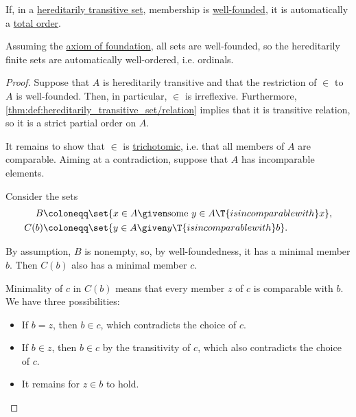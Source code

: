 \begin{lemma}\label{thm:well_founded_hereditarily_transitive_set}
  If, in a \hyperref[def:hereditarily_transitive_set]{hereditarily transitive set}, membership is \hyperref[def:well_founded_relation]{well-founded}, it is automatically a \hyperref[def:totally_ordered_set]{total order}.
\end{lemma}
\begin{comments}
  \item Assuming the \hyperref[def:zfc/foundation]{axiom of foundation}, all sets are well-founded, so the hereditarily finite sets are automatically well-ordered, i.e. ordinals.
\end{comments}
\begin{proof}
  Suppose that \( A \) is hereditarily transitive and that the restriction of \( {\in} \) to \( A \) is well-founded. Then, in particular, \( {\in} \) is irreflexive. Furthermore, \cref{thm:def:hereditarily_transitive_set/relation} implies that it is transitive relation, so it is a strict partial order on \( A \).

  It remains to show that \( {\in} \) is \hyperref[def:totally_ordered_set/trichotomic]{trichotomic}, i.e. that all members of \( A \) are comparable. Aiming at a contradiction, suppose that \( A \) has incomparable elements.

  Consider the sets
  \begin{align*}
    B    &\coloneqq \set{ x \in A \given \text{some } y \in A \T{is incomparable with} x }, \\
    C(b) &\coloneqq \set{ y \in A \given y \T{is incomparable with} b }.
  \end{align*}

  By assumption, \( B \) is nonempty, so, by well-foundedness, it has a minimal member \( b \). Then \( C(b) \) also has a minimal member \( c \).

  Minimality of \( c \) in \( C(b) \) means that every member \( z \) of \( c \) is comparable with \( b \). We have three possibilities:
  \begin{itemize}
    \item If \( b = z \), then \( b \in c \), which contradicts the choice of \( c \).
    \item If \( b \in z \), then \( b \in c \) by the transitivity of \( c \), which also contradicts the choice of \( c \).
    \item It remains for \( z \in b \) to hold.
  \end{itemize}


\end{proof}
